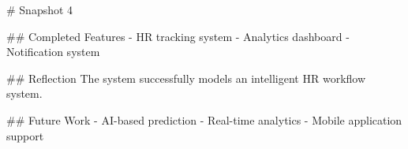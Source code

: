 
# Snapshot 4

## Completed Features
- HR tracking system
- Analytics dashboard
- Notification system

## Reflection
The system successfully models an intelligent HR workflow system.

## Future Work
- AI-based prediction
- Real-time analytics
- Mobile application support

